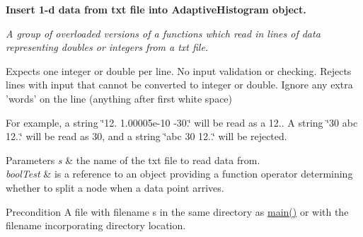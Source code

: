 \begin{Indent}{\bf \-Insert 1-\/d data from txt file into \-Adaptive\-Histogram object.}\par
{\em \-A group of overloaded versions of a functions which read in lines of data representing doubles or integers from a txt file.

\-Expects one integer or double per line. \-No input validation or checking. \-Rejects lines with input that cannot be converted to integer or double. \-Ignore any extra 'words' on the line (anything after first white space)

\-For example, a string \char`\"{}12. 1.\-00005e-\/10 -\/30.\char`\"{} will be read as a 12.. \-A string \char`\"{}30 abc 12..\char`\"{} will be read as 30, and a string \char`\"{}abc 30 12..\char`\"{} will be rejected.


\begin{DoxyParams}{\-Parameters}
{\em s} & the name of the txt file to read data from. \\
\hline
{\em bool\-Test} & is a reference to an object providing a function operator determining whether to split a node when a data point arrives. \\
\hline
\end{DoxyParams}
\begin{DoxyPrecond}{\-Precondition}
\-A file with filename s in the same directory as \hyperlink{Exm__3__3_8cpp_ae66f6b31b5ad750f1fe042a706a4e3d4}{main()} or with the filename incorporating directory location. 
\end{DoxyPrecond}

}
\end{Indent}
